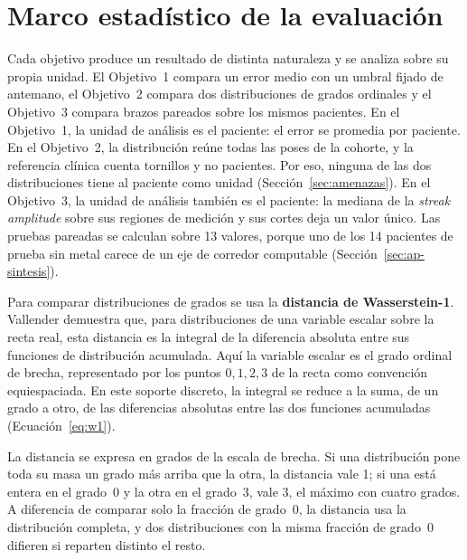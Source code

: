 \section{Marco estadístico de la evaluación}\label{sec:mt-estadistica}

Cada objetivo produce un resultado de distinta naturaleza y se analiza sobre su propia unidad. El Objetivo~1 compara un error medio con un umbral fijado de antemano, el Objetivo~2 compara dos distribuciones de grados ordinales y el Objetivo~3 compara brazos pareados sobre los mismos pacientes. En el Objetivo~1, la unidad de análisis es el paciente: el error se promedia por paciente. En el Objetivo~2, la distribución reúne todas las poses de la cohorte, y la referencia clínica cuenta tornillos y no pacientes. Por eso, ninguna de las dos distribuciones tiene al paciente como unidad (Sección~\ref{sec:amenazas}). En el Objetivo~3, la unidad de análisis también es el paciente: la mediana de la \emph{streak amplitude} sobre sus regiones de medición y sus cortes deja un valor único. Las pruebas pareadas se calculan sobre 13 valores, porque uno de los 14 pacientes de prueba sin metal carece de un eje de corredor computable (Sección~\ref{sec:ap-sintesis}).

Para comparar distribuciones de grados se usa la \textbf{distancia de Wasserstein-1}. Vallender \cite{vallender1974wasserstein} demuestra que, para distribuciones de una variable escalar sobre la recta real, esta distancia es la integral de la diferencia absoluta entre sus funciones de distribución acumulada. Aquí la variable escalar es el grado ordinal de brecha, representado por los puntos $0,1,2,3$ de la recta como convención equiespaciada. En este soporte discreto, la integral se reduce a la suma, de un grado a otro, de las diferencias absolutas entre las dos funciones acumuladas (Ecuación~\ref{eq:w1}).

La distancia se expresa en grados de la escala de brecha. Si una distribución pone toda su masa un grado más arriba que la otra, la distancia vale 1; si una está entera en el grado~0 y la otra en el grado~3, vale 3, el máximo con cuatro grados. A diferencia de comparar solo la fracción de grado~0, la distancia usa la distribución completa, y dos distribuciones con la misma fracción de grado~0 difieren si reparten distinto el resto.

